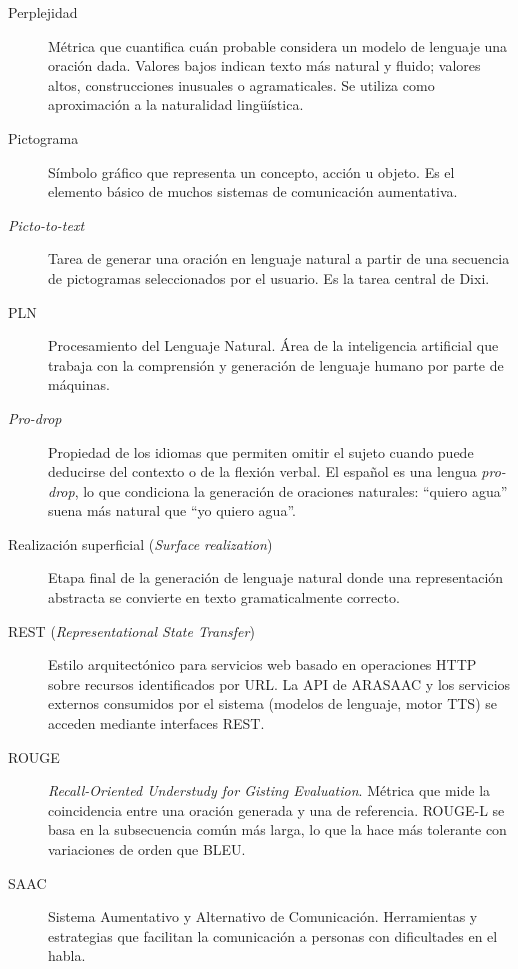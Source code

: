\begin{description}
    \item[Perplejidad] Métrica que cuantifica cuán probable considera un modelo de lenguaje una oración dada. Valores bajos indican texto más natural y fluido; valores altos, construcciones inusuales o agramaticales. Se utiliza como aproximación a la naturalidad lingüística.

    \item[Pictograma] Símbolo gráfico que representa un concepto, acción u objeto. Es el elemento básico de muchos sistemas de comunicación aumentativa.

    \item[\textit{Picto-to-text}] Tarea de generar una oración en lenguaje natural a partir de una secuencia de pictogramas seleccionados por el usuario. Es la tarea central de Dixi.

    \item[PLN] Procesamiento del Lenguaje Natural. Área de la inteligencia artificial que trabaja con la comprensión y generación de lenguaje humano por parte de máquinas.

    \item[\textit{Pro-drop}] Propiedad de los idiomas que permiten omitir el sujeto cuando puede deducirse del contexto o de la flexión verbal. El español es una lengua \textit{pro-drop}, lo que condiciona la generación de oraciones naturales: ``quiero agua'' suena más natural que ``yo quiero agua''.

    \item[Realización superficial (\textit{Surface realization})] Etapa final de la generación de lenguaje natural donde una representación abstracta se convierte en texto gramaticalmente correcto.

    \item[REST (\textit{Representational State Transfer})] Estilo arquitectónico para servicios web basado en operaciones HTTP sobre recursos identificados por URL. La API de ARASAAC y los servicios externos consumidos por el sistema (modelos de lenguaje, motor TTS) se acceden mediante interfaces REST.

    \item[ROUGE] \textit{Recall-Oriented Understudy for Gisting Evaluation}. Métrica que mide la coincidencia entre una oración generada y una de referencia. ROUGE-L se basa en la subsecuencia común más larga, lo que la hace más tolerante con variaciones de orden que BLEU.

    \item[SAAC] Sistema Aumentativo y Alternativo de Comunicación. Herramientas y estrategias que facilitan la comunicación a personas con dificultades en el habla.


\end{description}
